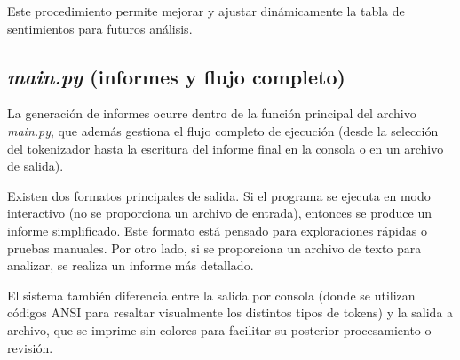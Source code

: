 Este procedimiento permite mejorar y ajustar dinámicamente la tabla de sentimientos para
futuros análisis.

\subsection{\textit{main.py} (informes y flujo completo)}

La generación de informes ocurre dentro de la función principal del archivo \textit{main.py},
que además gestiona el flujo completo de ejecución (desde la selección del tokenizador hasta la
escritura del informe final en la consola o en un archivo de salida).

Existen dos formatos principales de salida. Si el programa se ejecuta en modo interactivo (no
se proporciona un archivo de entrada), entonces se produce un informe simplificado. Este
formato está pensado para exploraciones rápidas o pruebas manuales. Por otro lado, si se
proporciona un archivo de texto para analizar, se realiza un informe más detallado.

El sistema también diferencia entre la salida por consola (donde se utilizan códigos ANSI para
resaltar visualmente los distintos tipos de tokens) y la salida a archivo, que se imprime sin
colores para facilitar su posterior procesamiento o revisión.
